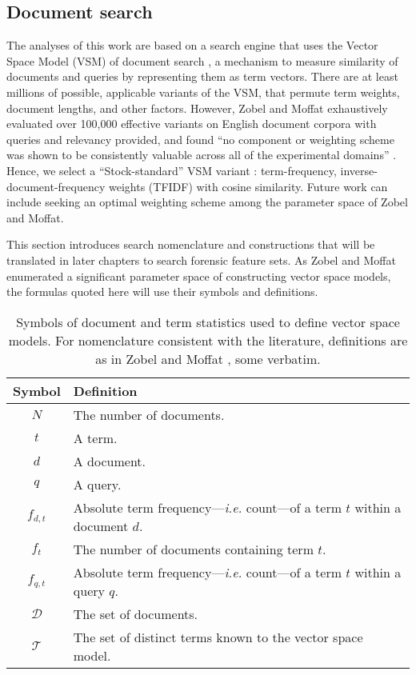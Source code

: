 \documentclass[11pt]{ucthesis}
\theoremstyle{plain}
\theoremstyle{definition}
\newcommand{\ie}{\emph{i.e.}\xspace}
\begin{document}
\subsection{Document search}
\label{sec:background:documentsearch}

The analyses of this work are based on a search engine that uses the Vector Space Model (VSM) of document search \cite{croft:addison-wesley10,zobel:sigir98}, a mechanism to measure similarity of documents and queries by representing them as term vectors.  There are at least millions of possible, applicable variants of the VSM, that permute term weights, document lengths, and other factors.  However, Zobel and Moffat exhaustively evaluated over 100,000 effective variants on English document corpora with queries and relevancy provided, and found ``no component or weighting scheme was shown to be consistently valuable across all of the experimental domains'' \cite[Conclusions]{zobel:sigir98}.  Hence, we select a ``Stock-standard'' VSM variant \cite{zobel:sigir98}: term-frequency, inverse-document-frequency weights (TFIDF) with cosine similarity.  Future work can include seeking an optimal weighting scheme among the parameter space of Zobel and Moffat.

This section introduces search nomenclature and constructions that will be translated in later chapters to search forensic feature sets.  As Zobel and Moffat enumerated a significant parameter space of constructing vector space models, the formulas quoted here will use their symbols and definitions.

\begin{table}[htp]
\caption{\label{tbl:vsmsymbols:statistics}Symbols of document and term statistics used to define vector space models.  For nomenclature consistent with the literature, definitions are as in Zobel and Moffat \cite{zobel:sigir98}, some verbatim.}
\begin{center}
\begin{small}
\begin{tabular}{cp{5in}}
\toprule
Symbol & Definition \\
\midrule
$N$ & The number of documents.\\
$t$ & A term. \\
$d$ & A document. \\
$q$ & A query. \\
$f_{d,t}$ & Absolute term frequency---\ie count---of a term $t$ within a document $d$. \\
$f_t$ & The number of documents containing term $t$. \\
$f_{q,t}$ & Absolute term frequency---\ie count---of a term $t$ within a query $q$. \\
$\mathcal{D}$ & The set of documents. \\
$\mathcal{T}$ & The set of distinct terms known to the vector space model. \\
\bottomrule
\end{tabular}
\end{small}
\end{center}
\end{table}
\end{document}
